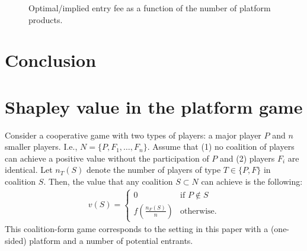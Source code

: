 \documentclass[a4paper]{article}
\begin{document}
\begin{figure}
    \centering
    \caption{Optimal/implied entry fee as a function of the number of platform products.}
    \label{fig:F_F_eq}
\end{figure}





\section{Conclusion}


\appendix

\printbibliography


\section{Shapley value in the platform game}

Consider a cooperative game with two types of players: a major player $P$ and $n$ smaller players.
I.e., $N = \{P, F_1, \dots, F_n\}$.
Assume that (1) no coalition of players can achieve a positive value without the participation of $P$ and (2) players $F_i$ are identical.
Let $n_T(S)$ denote the number of players of type $T \in \{P, F\}$ in coalition $S$. Then, the value that any coalition $S \subset N$ can achieve is the following:
\begin{align*}
    v(S) = \begin{cases}
        0                              & \text{if } P \notin S \\
        f\left(\frac{n_F(S)}{n}\right) & \text{otherwise}.
    \end{cases}
\end{align*}
This coalition-form game corresponds to the setting in this paper with a (one-sided) platform and a number of potential entrants.
\end{document}
